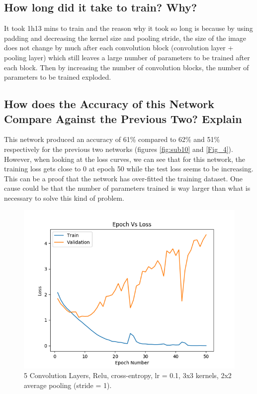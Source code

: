 \documentclass[12pt]{article}
\begin{document}
		\subsection{How long did it take to train? Why?}
		
			It took 1h13 mins to train and the reason why it took so long is because by using padding and decreasing the kernel size and pooling stride, the size of the image does not change by much after each convolution block (convolution layer + pooling layer) which still leaves a large number of parameters to be trained after each block. Then by increasing the number of convolution blocks, the number of parameters to be trained exploded.
			
		\subsection{How does the Accuracy of this Network Compare Against the Previous Two? Explain}
			This network produced an accuracy of 61\% compared to 62\% and 51\% respectively for the previous two networks (figures \ref{fig:sub10} and \ref{Fig_4}). However, when looking at the loss curves, we can see that for this network, the training loss gets close to 0 at epoch 50 while the test loss seems to be increasing. This can be a proof that the network has over-fitted the training dataset. One cause could be that the number of parameters trained is way larger than what is necessary to solve this kind of problem.
			\begin{figure}[h]
				\centering
				\begin{framed}
					\centering
					\includegraphics[width=12cm]{../Images/Epoch_VS_Loss/ReLU_5_conv_cross-entropy_01.png}
					\captionsetup{justification=centering,margin=1cm}
				\end{framed}
				\caption{5 Convolution Layers, Relu, cross-entropy, lr = 0.1, 3x3 kernels, 2x2 average pooling (stride = 1).}
				\label{Fig_5}
			\end{figure}
		
		
	
\end{document}
